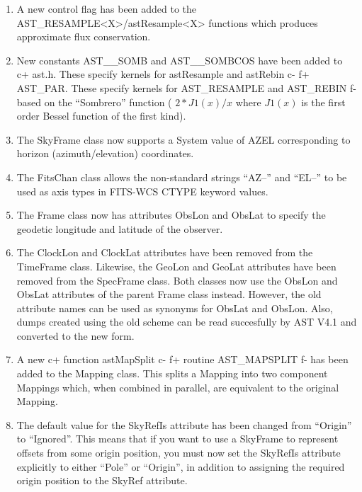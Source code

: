 \documentclass[twoside,11pt]{starlink}
\begin{document}
\begin{enumerate}

\item A new control flag has been added to the AST\_RESAMPLE<X>/astResample<X>
functions which produces approximate flux conservation.

\item New constants AST\_\_SOMB and AST\_\_SOMBCOS have been added to
c+
ast.h. These specify kernels for astResample and astRebin
c-
f+
AST\_PAR. These specify kernels for AST\_RESAMPLE and AST\_REBIN
f-
based on the ``Sombrero'' function ( $2*J1(x)/x$ where $J1(x)$ is the
first order Bessel function of the first kind).

\item The SkyFrame class now supports a System value of AZEL corresponding
to horizon (azimuth/elevation) coordinates.

\item The FitsChan class allows the non-standard strings ``AZ--'' and
``EL--'' to be used as axis types in FITS-WCS CTYPE keyword values.

\item The Frame class now has attributes ObsLon and ObsLat to specify
the geodetic longitude and latitude of the observer.

\item The ClockLon and ClockLat attributes have been removed from the
TimeFrame class. Likewise, the GeoLon and GeoLat attributes have been
removed from the SpecFrame class. Both classes now use the ObsLon and
ObsLat attributes of the parent Frame class instead. However, the old
attribute names can be used as synonyms for ObsLat and ObsLon. Also,
dumps created using the old scheme can be read succesfully by AST V4.1
and converted to the new form.

\item A new
c+
function astMapSplit
c-
f+
routine AST\_MAPSPLIT
f-
has been added to the Mapping class. This splits a Mapping into two component
Mappings which, when combined in parallel, are equivalent to the original
Mapping.

\item The default value for the SkyRefIs attribute has been changed from
``Origin'' to ``Ignored''. This means that if you want to use a SkyFrame
to represent offsets from some origin position, you must now set the
SkyRefIs attribute explicitly to either ``Pole'' or ``Origin'', in
addition to assigning the required origin position to the SkyRef attribute.

\end{enumerate}
\end{document}
